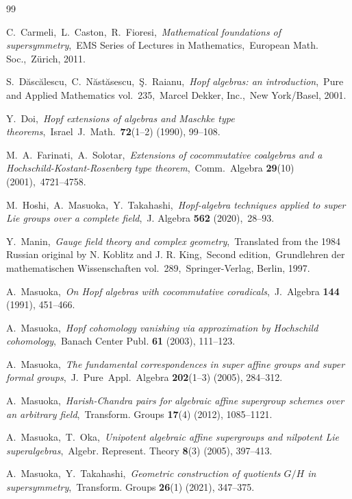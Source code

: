 \documentclass[11pt, a4paper]{amsart}
\theoremstyle{definition}
\numberwithin{equation}{section}
\begin{document}
\begin{thebibliography}{99}

C.~Carmeli,\ L.~Caston,\ R.~Fioresi,\
\emph{Mathematical foundations of supersymmetry},\
EMS Series of Lectures in Mathematics,\ European Math. Soc.,\
Z\"{u}rich, 2011.

\bibitem{DNR}
S.~D\u{a}sc\u{a}lescu,\ C.~N\u{a}st\u{a}sescu,\ \c{S}.~Raianu,\ \emph{Hopf algebras: an introduction},\
Pure and Applied Mathematics vol.\, 235,\ Marcel Dekker, Inc.,\ New York/Basel, 2001. 

\bibitem{D}
Y.~Doi,\
\emph{Hopf extensions of algebras and Maschke type theorems},\ 
Israel\ J.\ Math.\ {\bf 72}(1--2) (1990), 99--108.

M.~A.~Farinati,\ A.~Solotar,\ 
\emph{Extensions of cocommutative coalgebras and a Hochschild-Kostant-Rosenberg
type theorem},\ 
Comm.\ Algebra {\bf 29}(10) (2001),\ 4721–4758.


M.~Hoshi,\ A.~Masuoka,\ Y.~Takahashi,\
\emph{Hopf-algebra techniques applied to super Lie groups over a complete field},\
J. Algebra {\bf 562} (2020),\ 28--93.

\bibitem{Manin}
Y.~Manin,\
\emph{Gauge field theory and complex geometry},\
Translated from the 1984 Russian original by 
N. Koblitz and J. R. King,\ Second edition,\ 
Grundlehren der mathematischen Wissenschaften
vol.\, 289,\
Springer-Verlag, Berlin, 1997. 

\bibitem{M} 
A.~Masuoka,\
\emph{On Hopf algebras with cocommutative coradicals},\
J.\ Algebra \textbf{144} (1991), 451--466.

\bibitem{M1} 
A.~Masuoka,\
\emph{Hopf cohomology vanishing via approximation by Hochschild cohomology},\ 
Banach Center Publ. \textbf{61} (2003), 111--123.

A.~Masuoka,\
\emph{The fundamental correspondences in super affine groups and
super formal groups},\
J.\ Pure\ Appl.\ Algebra \textbf{202}(1--3) (2005), 284--312.

\bibitem{M3} 
A.~Masuoka,\ 
{\em Harish-Chandra pairs for algebraic affine supergroup schemes over an arbitrary field},\ 
Transform. Groups \textbf{17}(4) (2012), 1085--1121.
 
A.~Masuoka,\ T.~Oka,\ 
\emph{Unipotent algebraic affine supergroups and nilpotent Lie superalgebras},\
Algebr. Represent. Theory \textbf{8}(3) (2005), 397--413. 

\bibitem{MT}
A.~Masuoka,\ Y.~Takahashi,\ \emph{Geometric construction of quotients $G/H$ in
supersymmetry},\ Transform. Groups {\bf 26}(1) (2021), 347--375.


\end{thebibliography}
\end{document}
